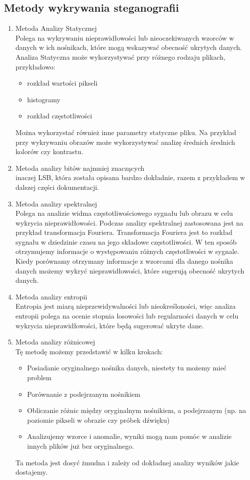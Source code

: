 \documentclass{article}
\begin{document}
\subsection{Metody wykrywania steganografii}
\begin{enumerate}
	\item Metoda Analizy Statycznej\\
Polega na wykrywaniu nieprawidłowości lub nieoczekiwanych wzorców w danych w ich nośnikach, które mogą wskazywać obecność ukrytych danych. Analiza Statyczna może wykorzystywać przy różnego rodzaju plikach, przykładowo:
        \begin{itemize}
            \item rozkład wartości pikseli
            \item histogramy
            \item rozkład częstotliwości
        \end{itemize}
Można wykorzystać również inne parametry statyczne pliku. Na przykład przy wykrywaniu obrazów może wykorzystywać analizę średnich średnich kolorów czy kontrastu.
        \item Metoda analizy bitów najmniej znaczących\\
        inaczej LSB, która została opisana bardzo dokładnie, razem z przykładem w dalszej części dokumentacji.
        \item Metoda analizy spektralnej\\
Polega na analizie widma częstotliwościowego sygnału lub obrazu w celu wykrycia nieprawidłowości. Podczas analizy spektralnej zastosowana jest na przykład transformacja Fouriera. Transformacja Fouriera jest to rozkład sygnału w dziedzinie czasu na jego składowe częstotliwości. W ten sposób otrzymujemy informacje o występowaniu różnych częstotliwości w sygnale. Kiedy porównamy otrzymany informacje z wzorcami dla danego nośnika danych możemy wykryć nieprawidłowości, które sugerują obecność ukrytych danych.
        \item Metoda analizy entropii\\
Entropia jest miarą nieprzewidywalności lub nieokreśloności, więc analiza entropii polega na ocenie stopnia losowości lub regularności danych w celu wykrycia nieprawidłowości, które będą sugerować ukryte dane.
        \item Metoda analizy różnicowej\\
Tę metodę możemy przedstawić w kilku krokach:
        \begin{itemize}
            \item Posiadanie oryginalnego nośnika danych, niestety tu możemy mieć problem
            \item Porównanie z podejrzanym nośnikiem
            \item Obliczanie różnic między oryginalnym nośnikiem, a podejrzanym (np. na poziomie pikseli w obrazie czy próbek dźwięku)
            \item Analizujemy wzorce i anomalie, wyniki mogą nam pomóc w analizie innych plików już bez oryginalnego.
        \end{itemize}
Ta metoda jest dosyć żmudna i zależy od dokładnej analizy wyników jakie dostajemy.
\end{enumerate}
\end{document}
